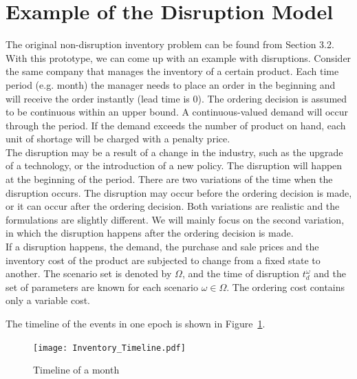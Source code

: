 \documentclass[11pt]{article}
\begin{document}
\section{Example of the Disruption Model}\label{sec:example}
	The original non-disruption inventory problem can be found from \cite{P94} Section 3.2. With this prototype, we can come up with an example with disruptions. Consider the same company that manages the inventory of a certain product. Each time period (e.g. month) the manager needs to place an order in the beginning and will receive the order instantly (lead time is 0). 
	The ordering decision is assumed to be continuous within an upper bound. A continuous-valued demand will occur through the period. If the demand exceeds the number of product on hand, each unit of shortage will be charged with a penalty price. \\
	\newline The disruption may be a result of a change in the industry, such as the upgrade of a technology, or the introduction of a new policy. The disruption will happen at the beginning of the period. There are two variations of the time when the disruption occurs. The disruption may occur before the ordering decision is made, or it can occur after the ordering decision. Both variations are realistic and the formulations are slightly different. We will mainly focus on the second variation, in which the disruption happens after the ordering decision is made.\\
	\newline   If a disruption happens, the demand, the purchase and sale prices and the inventory cost of the product are subjected to change from a fixed state to another. The scenario set is denoted by \(\Omega\), and the time of disruption \(t_d^\omega\) and the set of parameters are known for each scenario \(\omega \in \Omega\). The ordering cost contains only a variable cost. 
	
	The timeline of the events in one epoch is shown in Figure~\ref{timeLine}. \\
	\begin{figure}[H]
		\centering
		\texttt{[image: Inventory\_Timeline.pdf]}
		\caption{Timeline of a month}
		\label{timeLine}
	\end{figure}
	
\end{document}
